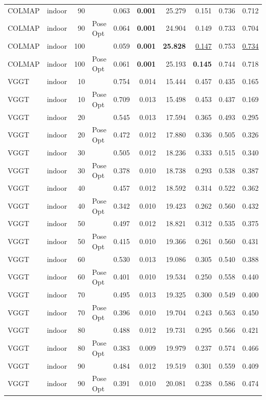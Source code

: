 \begin{table}[H]
\begin{tabular}{llrlrrrrrr}
COLMAP & indoor & 90 &  & 0.063 & \textbf{0.001} & 25.279 & 0.151 & 0.736 & 0.712 \\
COLMAP & indoor & 90 & Pose Opt & 0.064 & \textbf{0.001} & 24.904 & 0.149 & 0.733 & 0.704 \\
COLMAP & indoor & 100 &  & 0.059 & \textbf{0.001} & \textbf{25.828} & \underline{0.147} & 0.753 & \underline{0.734} \\
COLMAP & indoor & 100 & Pose Opt & 0.061 & \textbf{0.001} & 25.193 & \textbf{0.145} & 0.744 & 0.718 \\
VGGT & indoor & 10 &  & 0.754 & 0.014 & 15.444 & 0.457 & 0.435 & 0.165 \\
VGGT & indoor & 10 & Pose Opt & 0.709 & 0.013 & 15.498 & 0.453 & 0.437 & 0.169 \\
VGGT & indoor & 20 &  & 0.545 & 0.013 & 17.594 & 0.365 & 0.493 & 0.295 \\
VGGT & indoor & 20 & Pose Opt & 0.472 & 0.012 & 17.880 & 0.336 & 0.505 & 0.326 \\
VGGT & indoor & 30 &  & 0.505 & 0.012 & 18.236 & 0.333 & 0.515 & 0.340 \\
VGGT & indoor & 30 & Pose Opt & 0.378 & 0.010 & 18.738 & 0.293 & 0.538 & 0.387 \\
VGGT & indoor & 40 &  & 0.457 & 0.012 & 18.592 & 0.314 & 0.522 & 0.362 \\
VGGT & indoor & 40 & Pose Opt & 0.342 & 0.010 & 19.423 & 0.262 & 0.560 & 0.432 \\
VGGT & indoor & 50 &  & 0.497 & 0.012 & 18.821 & 0.312 & 0.535 & 0.375 \\
VGGT & indoor & 50 & Pose Opt & 0.415 & 0.010 & 19.366 & 0.261 & 0.560 & 0.431 \\
VGGT & indoor & 60 &  & 0.530 & 0.013 & 19.086 & 0.305 & 0.540 & 0.388 \\
VGGT & indoor & 60 & Pose Opt & 0.401 & 0.010 & 19.534 & 0.250 & 0.558 & 0.440 \\
VGGT & indoor & 70 &  & 0.495 & 0.013 & 19.325 & 0.300 & 0.549 & 0.400 \\
VGGT & indoor & 70 & Pose Opt & 0.396 & 0.010 & 19.704 & 0.243 & 0.563 & 0.450 \\
VGGT & indoor & 80 &  & 0.488 & 0.012 & 19.731 & 0.295 & 0.566 & 0.421 \\
VGGT & indoor & 80 & Pose Opt & 0.383 & 0.009 & 19.979 & 0.237 & 0.574 & 0.466 \\
VGGT & indoor & 90 &  & 0.484 & 0.012 & 19.519 & 0.301 & 0.559 & 0.409 \\
VGGT & indoor & 90 & Pose Opt & 0.391 & 0.010 & 20.081 & 0.238 & 0.586 & 0.474 \\

\end{tabular}
\end{table}
